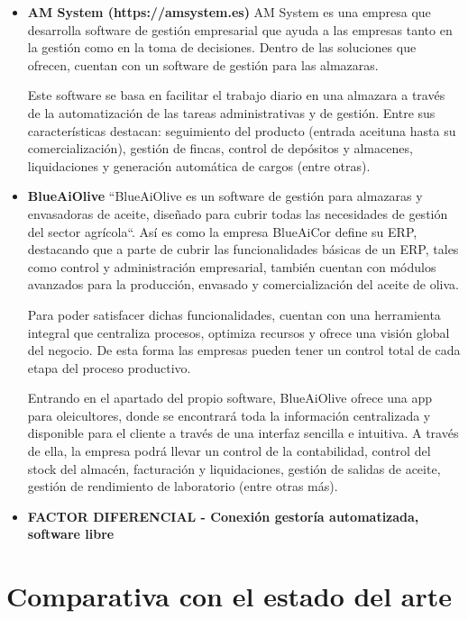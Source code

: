 \begin{itemize}
    \item \textbf{AM System (https://amsystem.es)} 
    \newline
    AM System es una empresa que desarrolla software de gestión empresarial que ayuda a las empresas tanto en la 
    gestión como en la toma de decisiones. Dentro de las soluciones que ofrecen, cuentan con un software de gestión
    para las almazaras.

    Este software se basa en facilitar el trabajo diario en una almazara a través de la automatización de las tareas
    administrativas y de gestión. Entre sus características destacan: seguimiento del producto (entrada aceituna
    hasta su comercialización), gestión de fincas, control de depósitos y almacenes, liquidaciones y generación
    automática de cargos (entre otras).

    \item \textbf{BlueAiOlive}
    \newline 
    ``BlueAiOlive es un software de gestión para almazaras y envasadoras de aceite, diseñado para cubrir todas
    las necesidades de gestión del sector agrícola``. Así es como la empresa BlueAiCor define su ERP, destacando que a parte de cubrir
    las funcionalidades básicas de un ERP, tales como control y administración empresarial, también cuentan con módulos
    avanzados para la producción, envasado y comercialización del aceite de oliva.

    Para poder satisfacer dichas funcionalidades, cuentan con una herramienta integral que centraliza procesos, optimiza
    recursos y ofrece una visión global del negocio. De esta forma las empresas pueden tener un control total de cada etapa
    del proceso productivo.

    Entrando en el apartado del propio software, BlueAiOlive ofrece una app para oleicultores, donde se encontrará toda la
    información centralizada y disponible para el cliente a través de una interfaz sencilla e intuitiva. A través de ella,
    la empresa podrá llevar un control de la contabilidad, control del stock del almacén, facturación y liquidaciones, gestión
    de salidas de aceite, gestión de rendimiento de laboratorio (entre otras más).

    
    \item \textbf{FACTOR DIFERENCIAL - Conexión gestoría automatizada, software libre}
\end{itemize}

\section{Comparativa con el estado del arte}

